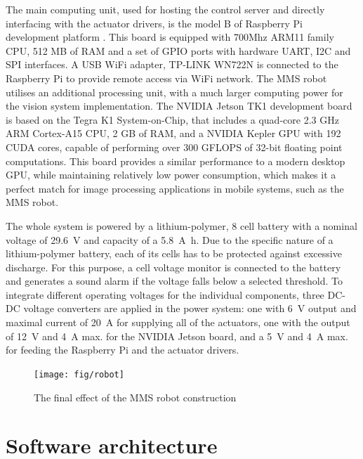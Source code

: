 The main computing unit, used for hosting the control server and directly interfacing with the actuator drivers, is the model B of Raspberry Pi development platform \cite{wikipedia}. This board is equipped with 700Mhz ARM11 family CPU, 512 MB of RAM and a set of GPIO ports with hardware UART, I2C and SPI interfaces. A USB WiFi adapter, TP-LINK WN722N is connected to the Raspberry Pi to provide remote access via WiFi network. The MMS robot utilises an additional processing unit, with a much larger computing power for the vision system implementation. The NVIDIA Jetson TK1 \cite{nvidia} development board is based on the Tegra K1 System-on-Chip, that includes a quad-core 2.3 GHz ARM Cortex-A15 CPU, 2 GB of RAM, and a NVIDIA Kepler GPU with 192 CUDA cores, capable of performing over 300 GFLOPS of 32-bit floating point computations. This board provides a similar performance to a modern desktop GPU, while maintaining relatively low power consumption, which makes it a perfect match for image processing applications in mobile systems, such as the MMS robot.  

The whole system is powered by a lithium-polymer, 8 cell battery with a nominal voltage of \SI{29.6}{\volt} and capacity of a \SI{5.8}{\ampere\hour}. Due to the specific nature of a lithium-polymer battery, each of its cells has to be protected against excessive discharge. For this purpose, a cell voltage monitor is connected to the battery and generates a sound alarm if the voltage falls below a selected threshold. To integrate different operating voltages for the individual components, three DC-DC voltage converters are applied in the power system: one with \SI{6}{\volt} output and maximal current of \SI{20}{\ampere} for supplying all of the actuators, one with the output of \SI{12}{\volt} and \SI{4}{\ampere} max. for the NVIDIA Jetson board, and a \SI{5}{\volt} and \SI{4}{\ampere} max. for feeding the Raspberry Pi and the actuator drivers.

\begin{figure}[H]
\centering
\texttt{[image: fig/robot]}
\caption{The final effect of the MMS robot construction}
\label{fig:assembled}
\end{figure}

\section{Software architecture}
\label{sec:soft}

